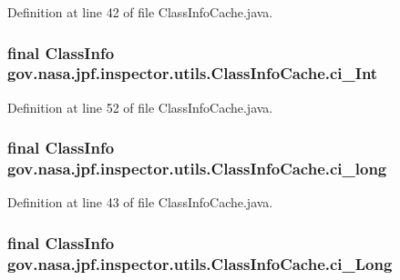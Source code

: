 Definition at line 42 of file Class\+Info\+Cache.\+java.

\subsubsection[{\texorpdfstring{ci\+\_\+\+Int}{ci_Int}}]{\setlength{\rightskip}{0pt plus 5cm}final Class\+Info gov.\+nasa.\+jpf.\+inspector.\+utils.\+Class\+Info\+Cache.\+ci\+\_\+\+Int}\hypertarget{classgov_1_1nasa_1_1jpf_1_1inspector_1_1utils_1_1_class_info_cache_a3b473de6d927038466bee13b61c7cb47}{}\label{classgov_1_1nasa_1_1jpf_1_1inspector_1_1utils_1_1_class_info_cache_a3b473de6d927038466bee13b61c7cb47}


Definition at line 52 of file Class\+Info\+Cache.\+java.

\subsubsection[{\texorpdfstring{ci\+\_\+long}{ci_long}}]{\setlength{\rightskip}{0pt plus 5cm}final Class\+Info gov.\+nasa.\+jpf.\+inspector.\+utils.\+Class\+Info\+Cache.\+ci\+\_\+long}\hypertarget{classgov_1_1nasa_1_1jpf_1_1inspector_1_1utils_1_1_class_info_cache_a443fc5040ae83e418b516f65c9353a1a}{}\label{classgov_1_1nasa_1_1jpf_1_1inspector_1_1utils_1_1_class_info_cache_a443fc5040ae83e418b516f65c9353a1a}


Definition at line 43 of file Class\+Info\+Cache.\+java.

\subsubsection[{\texorpdfstring{ci\+\_\+\+Long}{ci_Long}}]{\setlength{\rightskip}{0pt plus 5cm}final Class\+Info gov.\+nasa.\+jpf.\+inspector.\+utils.\+Class\+Info\+Cache.\+ci\+\_\+\+Long}\hypertarget{classgov_1_1nasa_1_1jpf_1_1inspector_1_1utils_1_1_class_info_cache_a6d7daa36979cf1cc7c46059d9307c9dc}{}\label{classgov_1_1nasa_1_1jpf_1_1inspector_1_1utils_1_1_class_info_cache_a6d7daa36979cf1cc7c46059d9307c9dc}


